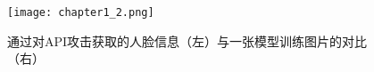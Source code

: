 \begin{figure}
  \centering
  \texttt{[image: chapter1\_2.png]}
  \caption{通过对API攻击获取的人脸信息（左）与一张模型训练图片的对比（右）\cite{Fredrikson2015}}
  \label{fig:chapter1_2}
\end{figure}



